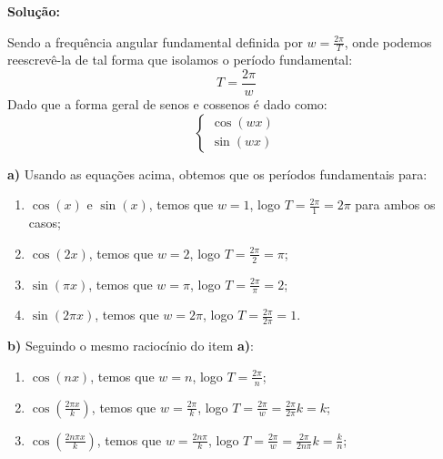 \linespread{1.5}

\textbf{Solução:}

Sendo a frequência angular fundamental definida por {\leftarge $w=\frac{2\pi}{T}$}, onde podemos reescrevê-la de tal forma que isolamos o período fundamental:
{\leftarge \begin{equation*}
    \label{eq:per_fund}
    T = \frac{2\pi}{w}
\end{equation*}}
Dado que a forma geral de senos e cossenos é dado como:
\begin{equation*}
    \begin{cases}
        \cos{(wx)}\\
        \sin{(wx)}
    \end{cases}
\end{equation*}

\textbf{a)}
Usando as equações acima, obtemos que os períodos fundamentais para:
\begin{enumerate}[i]
    \item $\cos{(x)}$ e $\sin{(x)}$, temos que $w=1$, logo $T=\frac{2\pi}{1} = 2\pi$ para ambos os casos;
    \item $\cos{(2x)}$, temos que $w=2$, logo $T=\frac{2\pi}{2} = \pi$;
    \item $\sin{(\pi x)}$, temos que $w=\pi$, logo $T=\frac{2\pi}{\pi} = 2$;
    \item $\sin{(2\pi x)}$, temos que $w=2\pi$, logo $T=\frac{2\pi}{2\pi} = 1$.
\end{enumerate}

\textbf{b)} Seguindo o mesmo raciocínio do item \textbf{a)}:

\begin{enumerate}[i]
    \item $\cos{(nx)}$, temos que $w=n$, logo $T=\frac{2\pi}{n}$;
    \item $\cos{\left(\frac{2\pi x}{k}\right)}$, temos que $w=\frac{2\pi}{k}$, logo $T=\frac{2\pi}{w} = \frac{2\pi}{2\pi}k = k$;
    \item $\cos{\left(\frac{2n\pi x}{k}\right)}$, temos que $w=\frac{2n\pi}{k}$, logo $T=\frac{2\pi}{w} = \frac{2\pi}{2n\pi}k = \frac{k}{n}$;
\end{enumerate}